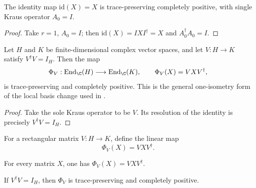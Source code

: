 \begin{lemma}
    \label{lem:is_kraus_cptp_id}
    \leanok
    The identity map $\mathrm{id}(X) = X$ is trace-preserving completely positive,
    with single Kraus operator $A_0 = I$.
\end{lemma}
\begin{proof}
    \leanok
    Take $r = 1$, $A_0 = I$; then $\mathrm{id}(X) = I X I^\dagger = X$ and
    $A_0^\dagger A_0 = I$.
\end{proof}

\begin{theorem}
    \label{thm:mpdo_single_kraus_isometry_cptp}
    \leanok
    Let $H$ and $K$ be finite-dimensional complex vector spaces, and let
    $V:H\to K$ satisfy $V^\dagger V=I_H$. Then the map
    \[
        \Phi_V:\operatorname{End}_{\C}(H)\longrightarrow
          \operatorname{End}_{\C}(K),
        \qquad \Phi_V(X)=VXV^\dagger,
    \]
    is trace-preserving and completely positive. This is the general
    one-isometry form of the local basis change used in
    \cite[Appendix~C.2, lines~1439 and~1520]{Cirac2016MPDO_arXiv}.
\end{theorem}
\begin{proof}
    \leanok
    Take the sole Kraus operator to be $V$. Its resolution of the identity is
    precisely $V^\dagger V=I_H$.
\end{proof}

\begin{definition}
    \label{def:mpdo_single_kraus_map}
    \leanok
    For a rectangular matrix $V:H\to K$, define the linear map
    \[
      \Phi_V(X)=VXV^\dagger.
    \]
\end{definition}

\begin{lemma}
    \label{lem:mpdo_single_kraus_map_apply}
    \leanok
    For every matrix $X$, one has $\Phi_V(X)=VXV^\dagger$.
\end{lemma}

\begin{theorem}
    \label{thm:mpdo_single_kraus_map_cptp}
    \leanok
    If $V^\dagger V=I_H$, then $\Phi_V$ is trace-preserving and completely
    positive.
\end{theorem}

